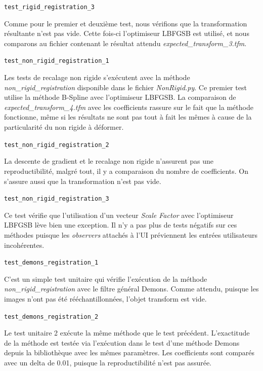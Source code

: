 \documentclass{article}
\newcommand{\method}[1]{\hspace{1in}\texttt{#1}\bigskip}
\begin{document}
{{{            \bigskip
            \method{test\_rigid\_registration\_3}

            Comme pour le premier et deuxième test, nous vérifions que la transformation résultante n'est pas vide. Cette fois-ci l'optimiseur LBFGSB est utilisé, et nous comparons au fichier contenant le résultat attendu \textit{expected\_transform\_3.tfm}.

            \bigskip
            \method{test\_non\_rigid\_registration\_1}

            Les tests de recalage non rigide s'exécutent avec la méthode \textit{non\_rigid\_registration} disponible dans le fichier \textit{NonRigid.py}. Ce premier test utilise la méthode B-Spline avec l'optimiseur LBFGSB. La comparaison de \textit{expected\_transform\_4.tfm} avec les coefficients rassure sur le fait que la méthode fonctionne, même si les résultats ne sont pas tout à fait les mêmes à cause de la particularité du non rigide à déformer.

            \bigskip
            \method{test\_non\_rigid\_registration\_2}

            La descente de gradient et le recalage non rigide n'assurent pas une reproductibilité, malgré tout, il y a comparaison du nombre de coefficients. On s'assure aussi que la transformation n'est pas vide.

            \bigskip
            \method{test\_non\_rigid\_registration\_3}

            Ce test vérifie que l'utilisation d'un vecteur \textit{Scale Factor} avec l'optimiseur LBFGSB lève bien une exception. Il n'y a pas plus de tests négatifs sur ces méthodes puisque les \textit{observers} attachés à l'UI préviennent les entrées utilisateurs incohérentes.

            \bigskip
            \method{test\_demons\_registration\_1}

            C'est un simple test unitaire qui vérifie l'exécution de la méthode \textit{non\_rigid\_registration} avec le filtre général Demons. Comme attendu, puisque les images n'ont pas été rééchantillonnées, l'objet transform est vide.

            \bigskip
            \method{test\_demons\_registration\_2}

            Le test unitaire 2 exécute la même méthode que le test précédent. L'exactitude de la méthode est testée via l'exécution dans le test d'une méthode Demons depuis la bibliothèque avec les mêmes paramètres. Les coefficients sont comparés avec un delta de 0.01, puisque la reproductibilité n'est pas assurée.

}}}
\end{document}

